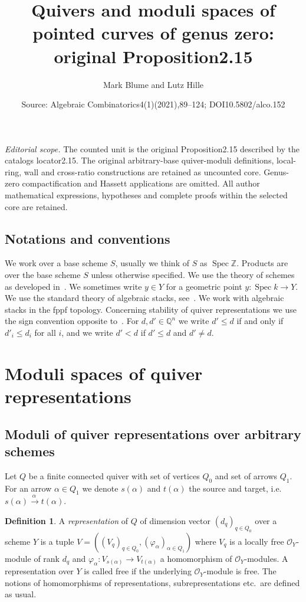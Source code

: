 \documentclass[10pt,a4paper]{amsart}
\title[Inverse-limit quiver moduli functor]{Quivers and moduli spaces of pointed curves of genus zero: original Proposition2.15}
\author{Mark Blume and Lutz Hille}
\date{Source: Algebraic Combinatorics4(1)(2021),89--124; DOI10.5802/alco.152}
\newcommand{\ie}{i.e.\ }
\theoremstyle{definition}
\newtheorem{defi}[theo]{Definition}
\def\Z{\mathds Z}
\def\Q{\mathds Q}
\def\phi{\varphi}
\def\O{\mathcal O}
\DeclareMathOperator{\Spec}{Spec}
\begin{document}
\maketitle
\noindent\textit{Editorial scope.} The counted unit is the original Proposition2.15 described by the catalog\textquotesingle s locator2.15. The original arbitrary-base quiver-moduli definitions, local-ring, wall and cross-ratio constructions are retained as uncounted core. Genus-zero compactification and Hassett applications are omitted. All author mathematical expressions, hypotheses and complete proofs within the selected core are retained.
\subsection*{Notations and conventions}
We work over a base scheme $S$, usually we think of $S$ as $\Spec\Z$.
Products are over the base scheme $S$ unless otherwise specified. 
We use the theory of schemes as developed in~\cite{EGA, EGA1}. 
We sometimes write $y\in Y$ for a geometric point $y\colon\Spec k\to Y$.
We use the standard theory of algebraic stacks, see~\cite{SP}. 
We work with algebraic stacks in the fppf topology.
Concerning stability of quiver representations we use the sign convention 
opposite to~\cite{Ki94}. For $d,d'\in\Q^n$ we write $d'\leq d$ if and only if 
$d'_i\leq d_i$ for all $i$, and we write $d'<d$ if $d'\leq d$ and $d'\neq d$.



\section{Moduli spaces of quiver representations}
\label{sec:moduliquiver}

\subsection{Moduli of quiver representations over arbitrary schemes}

Let $Q$ be a finite connected quiver with set of vertices $Q_0$ and
set of arrows $Q_1$. 
For an arrow $\alpha\in Q_1$ we denote $s(\alpha)$ and $t(\alpha)$ the source
and target, \ie $s(\alpha)\stackrel{\alpha\:}{\longrightarrow}t(\alpha)$.

\begin{defi}
A {\it representation} of $Q$ of dimension vector $(d_q)_{q\in Q_0}$ over 
a scheme $Y$ is a tuple $V=((V_q)_{q\in Q_0},(\phi_\alpha)_{\alpha\in Q_1})$ 
where $V_q$ is a locally free $\O_Y$-module of rank $d_q$ and
$\phi_\alpha\colon V_{s(\alpha)}\to V_{t(\alpha)}$ a homomorphism of 
$\O_Y$-modules. A representation over $Y$ is called free if the underlying
$\O_Y$-module is free. The notions of homomorphisms of representations,
subrepresentations etc.\ are defined as usual.
\end{defi}
\end{document}
